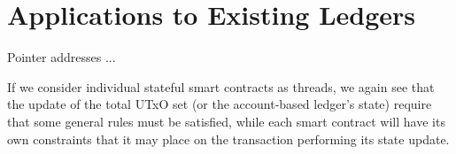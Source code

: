 \section{Applications to Existing Ledgers}
\label{sec:applications}


Pointer addresses ...

If we consider individual stateful smart contracts as threads, we again see that
the update of the total UTxO set (or the account-based ledger's state) require
that some general rules must be satisfied, while each smart contract will
have its own constraints that it may place on the transaction performing its
state update.

